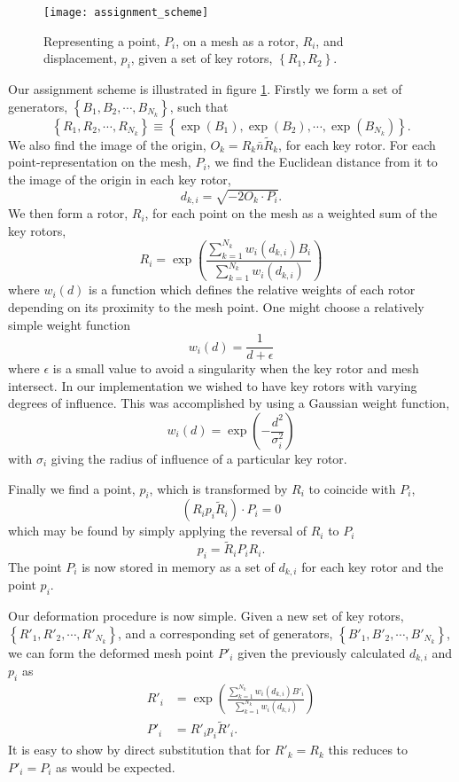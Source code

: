 \begin{figure}
\centering
\texttt{[image: assignment\_scheme]}
\caption{\label{fig:assignment_scheme}Representing a point, $P_i$, on a mesh as
a rotor, $R_i$, and displacement, $p_i$, given a set of key rotors, 
  $\left\{R_1, R_2\right\}$.}
\end{figure}

Our assignment scheme is illustrated in figure \ref{fig:assignment_scheme}.
Firstly we form a set of generators, $\left\{B_1, B_2, \cdots, B_{N_k}\right\}$,
such that
\[
\left\{ R_1, R_2, \cdots, R_{N_k} \right\} \equiv \left\{\exp(B_1), \exp(B_2),
        \cdots, \exp(B_{N_k})\right\}.
\]
We also find the image of the origin, $O_k = R_k\bar{n}\tilde{R}_k$, for 
each key rotor. For each point-representation on the mesh, $P_i$, we find the Euclidean
distance from it to the image of the origin in each key rotor,
\[
\label{eqn:dki}
d_{k,i} = \sqrt{-2O_k \cdot P_i}.
\]
We then form a rotor, $R_i$, for each point on the mesh as a weighted sum of the
key rotors,
\[
R_i = \exp\left(\frac{\sum^{N_k}_{k=1} w_i(d_{k,i}) B_i}{\sum^{N_k}_{k=1} w_i(d_{k,i})}\right)
\]
where $w_i(d)$ is a function which defines the relative weights of each rotor depending
on its proximity to the mesh point. One might choose a relatively simple weight function
\[
w_i(d) = \frac{1}{d + \epsilon}
\]
where $\epsilon$ is a small value to avoid a singularity when the key rotor and mesh
intersect. In our implementation we wished to have key rotors with varying degrees of 
influence. This was accomplished by using a Gaussian weight function,
\[
w_i(d) = \exp\left(-\frac{d^2}{\sigma_i^2}\right)
\]
with $\sigma_i$ giving the radius of influence of a particular key rotor.

Finally we find a point, $p_i$, which is transformed by $R_i$ to coincide
with $P_i$,
\[
(R_i p_i \tilde{R}_i) \cdot P_i = 0
\]
which may be found by simply applying the reversal of $R_i$ to $P_i$
\[
p_i = \tilde{R}_i P_i R_i.
\]
The point $P_i$ is now stored in memory as a set of $d_{k,i}$ for each
key rotor and the point $p_i$.

Our deformation procedure is now simple. Given a new set of key rotors,
$\left\{ R'_1, R'_2, \cdots, R'_{N_k} \right\}$, and a corresponding set of
generators, $\left\{B'_1, B'_2, \cdots, B'_{N_k}\right\}$, we can form the deformed
mesh point $P'_i$ given the previously calculated $d_{k,i}$ and $p_i$ as
\begin{align}
R'_i &= 
\exp\left(\frac{\sum^{N_k}_{k=1} w_i(d_{k,i}) B'_i}{\sum^{N_k}_{k=1} w_i(d_{k,i})}\right) \label{eqn:summation} \\
P'_i &= R'_i p_i \tilde{R}'_i.
\end{align}
It is easy to show by direct substitution that for $R'_k = R_k$ this 
reduces to $P'_i = P_i$ as would be expected.

